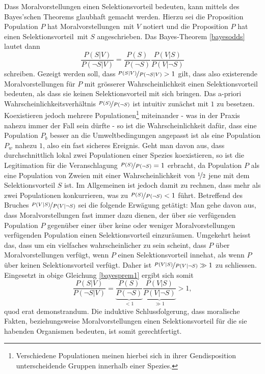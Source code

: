\documentclass[a4paper,11pt]{article}
\numberwithin{equation}{section}
\begin{document}
Dass Moralvorstellungen einen Selektionsvorteil bedeuten, kann mittels des Bayes'schen Theorems glaubhaft gemacht werden. Hierzu sei die Proposition \flqq Population $P$ hat Moralvorstellungen\frqq\ mit $V$ notiert und die Proposition \flqq $P$ hat einen Selektionsvorteil\frqq\ mit $S$ angeschrieben. Das Bayes-Theorem \eqref{bayesodds} lautet dann \begin{equation}\label{bayesprem1}
\frac{P(S|V)}{P(\neg S|V)}
= \frac{P(S)}{P(\neg S)}\frac{P(V|S)}{P(V|\neg S)}\end{equation} schreiben. Gezeigt werden soll, dass $\nicefrac{P(S|V)}{P(\neg S | V)} > 1$ gilt, dass also existerende Moralvorstellungen für $P$ mit grösserer Wahrscheinlichkeit einen Selektionsvorteil bedeuten, als dass sie keinen Selektionsvorteil mit sich bringen. Das a-priori Wahrscheinlichkeitsverhältnis $\nicefrac{P(S)}{P(\neg S)}$ ist intuitiv zunächst mit $1$ zu besetzen. Koexistieren jedoch mehrere Populationen\footnote{Verschiedene Populationen meinen hierbei sich in ihrer Gendisposition unterscheidende Gruppen innerhalb einer Spezies.} miteinander - was in der Praxis nahezu immer der Fall sein dürfte - so ist die Wahrscheinlichkeit dafür, dass eine Population $P_b$ besser an die Umweltbedingungen angepasst ist als eine Population $P_w$ nahezu $1$, also ein fast sicheres Ereignis. Geht man davon aus, dass durchschnittlich lokal zwei Populationen einer Spezies koexistieren, so ist die Legitimation für die Veranschlagung $\nicefrac{P(S)}{P(\neg S)}=1$ erbracht, da Population $P$ als eine Population von Zweien mit einer Wahrscheinlichkeit von $\nicefrac{1}{2}$ jene mit dem Selektionsvorteil $S$ ist. Im Allgemeinen ist jedoch damit zu rechnen, dass mehr als zwei Populationen konkurrieren, was zu $\nicefrac{P(S)}{P(\neg S)} < 1$ führt. Betreffend des Bruches $\nicefrac{P(V|S)}{P(V|\neg S)}$ sei die folgende Erwägung getätigt: Man gehe davon aus, dass Moralvorstellungen fast immer dazu dienen, der über sie verfügenden Population $P$ gegenüber einer über keine oder weniger Moralvorstellungen verfügenden Population einen Selektionsvorteil einzuräumen. Umgekehrt heisst das, dass um ein vielfaches wahrscheinlicher zu sein scheint, dass $P$ über Moralvorstellungen verfügt, wenn $P$ einen Selektionsvorteil innehat, als wenn $P$ über keinen Selektionsvorteil verfügt. Daher ist $\nicefrac{P(V|S)}{P(V|\neg S)} \gg 1$ zu schliessen. Eingesetzt in obige Gleichung \eqref{bayesprem1} ergibt sich somit \begin{equation}\label{premiss1tempresodds}
\frac{P(S|V)}{P(\neg S|V)} = \underbrace{\frac{P(S)}{P(\neg S)}}_{< 1}\underbrace{\frac{P(V|S)}{P(V|\neg S)}}_{\gg 1} > 1,
\end{equation} quod erat demonstrandum. Die induktive Schlussfolgerung, dass moralische Fakten, beziehungsweise Moralvorstellungen einen Selektionsvorteil für die sie habenden Organismen bedeuten, ist somit gerechtfertigt. 
\end{document}
